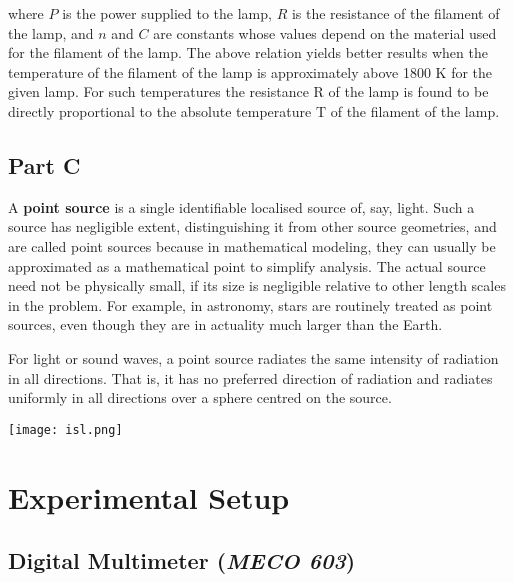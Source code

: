 where $P$ is the power supplied to the lamp, $R$ is the resistance of the filament of the lamp, and $n$ and $C$ are constants whose values depend on the material used for the filament of the lamp. The above relation yields better results when the temperature of the filament of the lamp is approximately above 1800 K for the given lamp. For such temperatures the resistance R of the lamp is found to be directly proportional to the absolute temperature T of the filament of the lamp.



\subsection*{Part C}


\begin{minipage}{0.5\linewidth}
A \textbf{point source} is a single identifiable localised source of, say, light. Such a source has negligible extent, distinguishing it from other source geometries, and are called point sources because in mathematical modeling, they can usually be approximated as a mathematical point to simplify analysis. The actual source need not be physically small, if its size is negligible relative to other length scales in the problem. For example, in astronomy, stars are routinely treated as point sources, even though they are in actuality much larger than the Earth.

For light or sound waves, a point source radiates the same intensity of radiation in all directions. That is, it has no preferred direction of radiation and radiates uniformly in all directions over a sphere centred on the source.
\end{minipage}
\begin{minipage}{0.5\linewidth}
\centering
\texttt{[image: isl.png]}
\end{minipage}



\section*{Experimental Setup}

\subsection*{Digital Multimeter (\textit{MECO 603})}

